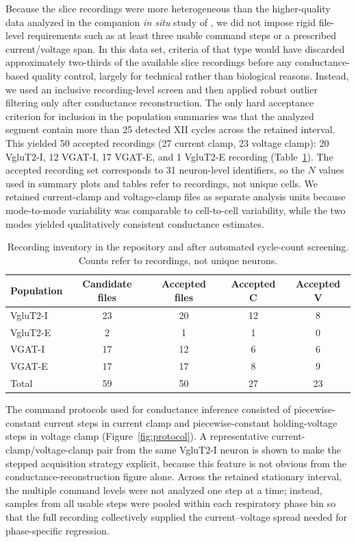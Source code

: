 \documentclass[11pt]{article}
\begin{document}
Because the slice recordings were more heterogeneous than the higher-quality data analyzed in the companion \textit{in situ} study of \citet{molkov2024inference}, we did not impose rigid file-level requirements such as at least three usable command steps or a prescribed current/voltage span. In this data set, criteria of that type would have discarded approximately two-thirds of the available slice recordings before any conductance-based quality control, largely for technical rather than biological reasons. Instead, we used an inclusive recording-level screen and then applied robust outlier filtering only after conductance reconstruction. The only hard acceptance criterion for inclusion in the population summaries was that the analyzed segment contain more than 25 detected XII cycles across the retained interval. This yielded 50 accepted recordings (27 current clamp, 23 voltage clamp): 20 VgluT2-I, 12 VGAT-I, 17 VGAT-E, and 1 VgluT2-E recording (Table~\ref{tab:inventory}). The accepted recording set corresponds to 31 neuron-level identifiers, so the $N$ values used in summary plots and tables refer to recordings, not unique cells. We retained current-clamp and voltage-clamp files as separate analysis units because mode-to-mode variability was comparable to cell-to-cell variability, while the two modes yielded qualitatively consistent conductance estimates.

\begin{table}[htbp]
\centering
\small
\caption{Recording inventory in the repository and after automated cycle-count screening. Counts refer to recordings, not unique neurons.}
\label{tab:inventory}
\begin{tabular}{lcccc}
\toprule
Population & Candidate files & Accepted files & Accepted C & Accepted V \\
\midrule
VgluT2-I & 23 & 20 & 12 & 8 \\
VgluT2-E & 2 & 1 & 1 & 0 \\
VGAT-I & 17 & 12 & 6 & 6 \\
VGAT-E & 17 & 17 & 8 & 9 \\
\midrule
Total & 59 & 50 & 27 & 23 \\
\bottomrule
\end{tabular}
\end{table}

The command protocols used for conductance inference consisted of piecewise-constant current steps in current clamp and piecewise-constant holding-voltage steps in voltage clamp (Figure~\ref{fig:protocol}). A representative current-clamp/voltage-clamp pair from the same VgluT2-I neuron is shown to make the stepped acquisition strategy explicit, because this feature is not obvious from the conductance-reconstruction figure alone. Across the retained stationary interval, the multiple command levels were not analyzed one step at a time; instead, samples from all usable steps were pooled within each respiratory phase bin so that the full recording collectively supplied the current--voltage spread needed for phase-specific regression.
\end{document}
